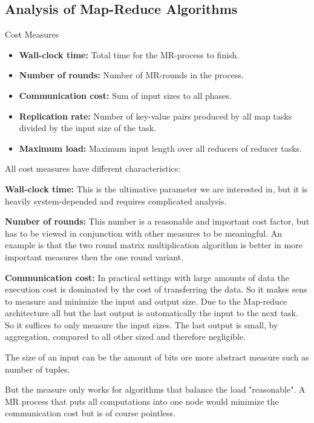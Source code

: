 \documentclass[english]{panikzettel}
\begin{document}
\subsection{Analysis of Map-Reduce Algorithms}
\begin{defi}{Cost Measures}
\begin{itemize}[leftmargin=*]
	\item \textbf{Wall-clock time:} Total time for the MR-process to finish.
	\item \textbf{Number of rounds:} Number of MR-rounds in the process.
	\item \textbf{Communication cost:} Sum of input sizes to all phases.
	\item \textbf{Replication rate:} Number of key-value pairs produced by all map tasks divided by the input size of the task.
	\item \textbf{Maximum load:} Maximum input length over all reducers of reducer tasks.
\end{itemize}
\end{defi}

All cost measures have different characteristics:

\textbf{Wall-clock time:} This is the ultimative parameter we are interested in, but it is heavily system-depended and requires complicated analysis.

\textbf{Number of rounds:} This number is a reasonable and important cost factor, but has to be viewed in conjunction with other measures to be meaningful. An example is that the two round matrix multiplication algorithm is better in more important measures then the one round variant.

\textbf{Communication cost:} In practical settings with large amounts of data the execution cost is dominated by the cost of transferring the data. So it makes sens to measure and minimize the input and output size.
Due to the Map-reduce architecture all but the last output is automatically the input to the next task. So it suffices to only measure the input sizes. The last output is small, by aggregation, compared to all other sized and therefore negligible.

The size of an input can be the amount of bits ore more abstract measure such as number of tuples.

But the measure only works for algorithms that balance the load "reasonable". A MR process that puts all computations into one node would minimize the communication cost but is of course pointless.
\end{document}

